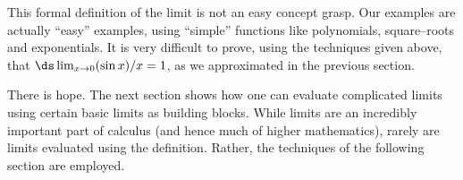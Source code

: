 This formal definition of the limit is not an easy concept grasp. Our examples are actually ``easy'' examples, using ``simple'' functions like polynomials, square--roots and exponentials. It is very difficult to prove, using the techniques given above, that $\ds \lim_{x\to 0}(\sin x)/x = 1$, as we approximated in the previous section.

There is hope. The next section shows how one can evaluate complicated limits using certain basic limits as building blocks. While limits are an incredibly important part of calculus (and hence much of higher mathematics), rarely are limits evaluated using the definition. Rather, the techniques of the following section are employed.


